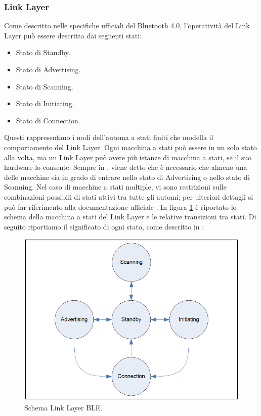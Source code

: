\subsubsection{Link Layer}
Come descritto nelle specifiche ufficiali del Bluetooth 4.0\cite{BT-CoreSpec4.0}, l'operatività del Link Layer può essere descritta dai seguenti stati:
\begin{itemize}
	\item Stato di Standby.
	\item Stato di Advertising.
	\item Stato di Scanning.
	\item Stato di Initiating.
	\item Stato di Connection.
\end{itemize}
Questi rappresentano i nodi dell'automa a stati finiti che modella il comportamento del Link Layer. Ogni macchina a stati può essere in un solo stato alla volta, ma un Link Layer può avere più istanze di macchina a stati, se il suo hardware lo consente. Sempre in \cite{BT-CoreSpec4.0}, viene detto che è necessario che almeno una delle macchine sia in grado di entrare nello stato di Advertising o nello stato di Scanning. Nel caso di macchine a stati multiple, vi sono restrizioni sulle combinazioni possibili di stati attivi tra tutte gli automi; per ulteriori dettagli si può far riferimento alla documentazione ufficiale \cite{BT-CoreSpec4.0}. In figura \ref{fig:bt_fsa} è riportato lo schema della macchina a stati del Link Layer e le relative transizioni tra stati. Di seguito riportiamo il significato di ogni stato, come descritto in \cite{BT-CoreSpec4.0}:
\begin{figure}[t]
	\centering
	\includegraphics[width=0.9\linewidth, keepaspectratio]{Images/bt/bt_fsa}
	\caption[Schema Link Layer]{Schema Link Layer \acs{BLE}\cite{BT-CoreSpec4.0}.}
	\label{fig:bt_fsa}
\end{figure}
